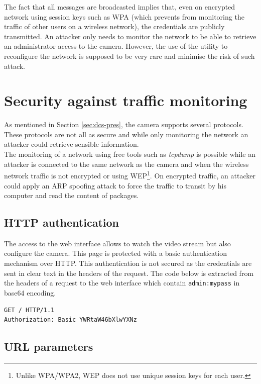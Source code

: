 The fact that all messages are broadcasted implies that, even on encrypted network using session keys such as WPA (which prevents from monitoring the traffic of other users on a wireless network), the credentials are publicly transmitted.
An attacker only needs to monitor the network to be able to retrieve an administrator access to the camera.
However, the use of the utility to reconfigure the network is supposed to be very rare and minimise the risk of such attack.

\section{Security against traffic monitoring}
\label{sec:dcs-proto}

As mentioned in Section \ref{sec:dcs-pres}, the camera supports several protocols.
These protocols are not all as secure and while only monitoring the network an attacker could retrieve sensible information.\\

The monitoring of a network using free tools such as \emph{tcpdump} is possible while an attacker is connected to the same network as the camera and when the wireless network traffic is not encrypted or using WEP\footnote{Unlike WPA/WPA2, WEP does not use unique session keys for each user.}.
On encrypted traffic, an attacker could apply an ARP spoofing attack to force the traffic to transit by his computer and read the content of packages.

\subsection{HTTP authentication}

The access to the web interface allows to watch the video stream but also configure the camera.
This page is protected with a basic authentication mechanism over HTTP.
This authentication is not secured as the credentials are sent in clear text in the headers of the request.
The code below is extracted from the headers of a request to the web interface which contain \texttt{admin:mypass} in base64 encoding.

{\scriptsize
\begin{verbatim}
GET / HTTP/1.1
Authorization: Basic YWRtaW46bXlwYXNz
\end{verbatim}
}

\subsection{URL parameters}

